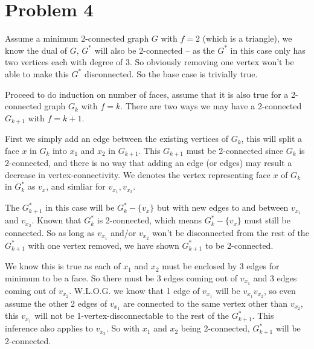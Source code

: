 \documentclass[11pt]{article}
\begin{document}
%
%






\section*{Problem 4}


Assume a minimum 2-connected graph $G$ with $f = 2$ (which is a triangle), we know the dual of $G$, $G^*$ will also be 2-connected -- as the $G^*$ in this case only has two vertices each with degree of $3$. So obviously removing one vertex won't be able to make this $G^*$ disconnected. So the base case is trivially true.\newline

Proceed to do induction on number of faces, assume that it is also true for a 2-connected graph $G_k$ with $f=k$. There are two ways we may have a 2-connected $G_{k+1}$ with $f = k+1$.\newline

First we simply add an edge between the existing vertices of $G_k$, this will split a face $x$ in $G_k$ into $x_1$ and $x_2$ in $G_{k+1}$. This $G_{k+1}$ must be 2-connected since $G_k$ is 2-connected, and there is no way that adding an edge (or edges) may result a decrease in vertex-connectivity. We denotes the vertex representing face $x$ of $G_k$ in $G^*_k$ as $v_x$, and simliar for $v_{x_1}, v_{x_2}$.

The $G^*_{k+1}$ in this case will be $G^*_k - \{v_x\}$ but with new edges to and between $v_{x_1}$ and $v_{x_2}$. Known that $G^*_k$ is 2-connected, which means $G^*_k - \{v_x\}$ must still be connected. So as long as $v_{x_1}$ and/or $v_{x_2}$ won't be disconnected from the rest of the $G^*_{k+1}$ with one vertex removed, we have shown $G^*_{k+1}$ to be 2-connected.


We know this is true as each of $x_1$ and $x_2$ must be enclosed by 3 edges for minimum to be a face. So there must be 3 edges coming out of $v_{x_1}$ and 3 edges coming out of $v_{x_2}$. W.L.O.G. we know that 1 edge of $v_{x_1}$ will be $v_{x_1}v_{x_2}$, so even assume the other 2 edges of $v_{x_1}$ are connected to the same vertex other than $v_{x_2}$, this $v_{x_1}$ will not be 1-vertex-disconnectable to the rest of the $G^*_{k+1}$. This inference also applies to $v_{x_2}$. So with $x_1$ and $x_2$ being 2-connected, $G^*_{k+1}$ will be 2-connected.\newline
\end{document}
